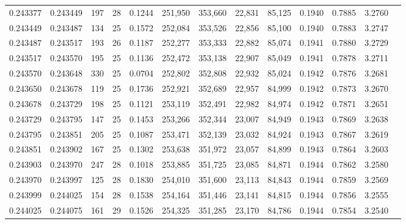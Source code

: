 \begin{tabular}{rrrrrrrrrrrrr}
0.243377 & 0.243449 &   197 &  28 &                                     0.1244 & 251,950 & 353,660 &  22,831 &  85,125 & 0.1940 & 0.7885 & 3.2760 \\
0.243449 & 0.243487 &   134 &  25 &                                     0.1572 & 252,084 & 353,526 &  22,856 &  85,100 & 0.1940 & 0.7883 & 3.2747 \\
0.243487 & 0.243517 &   193 &  26 &                                     0.1187 & 252,277 & 353,333 &  22,882 &  85,074 & 0.1941 & 0.7880 & 3.2729 \\
0.243517 & 0.243570 &   195 &  25 &                                     0.1136 & 252,472 & 353,138 &  22,907 &  85,049 & 0.1941 & 0.7878 & 3.2711 \\
0.243570 & 0.243648 &   330 &  25 &                                     0.0704 & 252,802 & 352,808 &  22,932 &  85,024 & 0.1942 & 0.7876 & 3.2681 \\
0.243650 & 0.243678 &   119 &  25 &                                     0.1736 & 252,921 & 352,689 &  22,957 &  84,999 & 0.1942 & 0.7873 & 3.2670 \\
0.243678 & 0.243729 &   198 &  25 &                                     0.1121 & 253,119 & 352,491 &  22,982 &  84,974 & 0.1942 & 0.7871 & 3.2651 \\
0.243729 & 0.243795 &   147 &  25 &                                     0.1453 & 253,266 & 352,344 &  23,007 &  84,949 & 0.1943 & 0.7869 & 3.2638 \\
0.243795 & 0.243851 &   205 &  25 &                                     0.1087 & 253,471 & 352,139 &  23,032 &  84,924 & 0.1943 & 0.7867 & 3.2619 \\
0.243851 & 0.243902 &   167 &  25 &                                     0.1302 & 253,638 & 351,972 &  23,057 &  84,899 & 0.1943 & 0.7864 & 3.2603 \\
0.243903 & 0.243970 &   247 &  28 &                                     0.1018 & 253,885 & 351,725 &  23,085 &  84,871 & 0.1944 & 0.7862 & 3.2580 \\
0.243970 & 0.243997 &   125 &  28 &                                     0.1830 & 254,010 & 351,600 &  23,113 &  84,843 & 0.1944 & 0.7859 & 3.2569 \\
0.243999 & 0.244025 &   154 &  28 &                                     0.1538 & 254,164 & 351,446 &  23,141 &  84,815 & 0.1944 & 0.7856 & 3.2555 \\
0.244025 & 0.244075 &   161 &  29 &                                     0.1526 & 254,325 & 351,285 &  23,170 &  84,786 & 0.1944 & 0.7854 & 3.2540 \\

\end{tabular}
